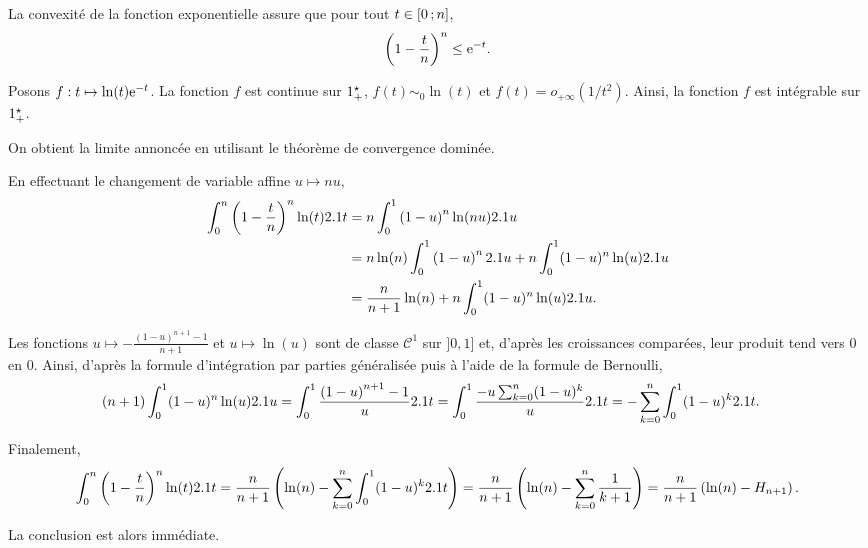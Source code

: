 \begin{solution}
\begin{reponses}
\item La convexité de la fonction exponentielle assure que pour tout $t \in \left[0\,;n\right]$,
\[
\left(1 - \frac{t}{n}\right)^n \leq \mathrm{e}^{-t}.
\]

Posons $f : t \mapsto \ln(t) \mathrm{e}^{-t}$. La fonction $f$ est continue sur $1^\star_+$, $f(t) \sim_0 \ln(t)$ et $f(t) = o_{+\infty}(1/t^2)$. Ainsi, la fonction $f$ est intégrable sur $1^\star_+$.

On obtient la limite annoncée en utilisant le théorème de convergence dominée.

\item En effectuant le changement de variable affine $u \mapsto n u$,
\begin{align*}
\int_0^n \left(1 - \frac{t}{n}\right)^n \ln(t) 2.1 t
&= n \int_0^1 \left(1 - u\right)^n \ln(n u) 2.1 u\\
&= n \ln(n) \int_0^1 \left(1 - u\right)^n 2.1 u + n \int_0^1 (1 - u)^n \ln(u) 2.1 u\\
&= \frac{n}{n+1} \ln(n) + n \int_0^1 (1 - u)^n \ln(u) 2.1 u.
\end{align*}

\item Les fonctions $u \mapsto -\frac{(1 - u)^{n+1} - 1}{n+1}$ et $u \mapsto \ln(u)$ sont de classe $\mathscr{C}^1$ sur $]0, 1]$ et, d'après les croissances comparées, leur produit tend vers $0$ en $0$. Ainsi, d'après la formule d'intégration par parties généralisée puis à l'aide de la formule de Bernoulli,
\begin{align*}
(n+1) \int_0^1 (1 - u)^n \ln(u) 2.1 u
&= \int_0^1 \frac{\left(1 - u\right)^{n+1} - 1}{u} 2.1 t
= \int_0^1 \frac{- u \sum_{k=0}^n (1 - u)^k}{u} 2.1 t
= -\sum_{k=0}^n \int_0^1 (1 - u)^k 2.1 t.
\end{align*}

\item Finalement,
\begin{align*}
\int_0^n \left(1 - \frac{t}{n}\right)^n \ln(t) 2.1 t
&= \frac{n}{n+1} \left(\ln(n) - \sum_{k=0}^n \int_0^1 (1 - u)^k 2.1 t\right)
= \frac{n}{n+1} \left(\ln(n) - \sum_{k=0}^n \frac{1}{k+1}\right)
= \frac{n}{n+1} \left(\ln(n) - H_{n+1}\right).\\
\end{align*}

\item La conclusion est alors immédiate.
\end{reponses}
\end{solution}


